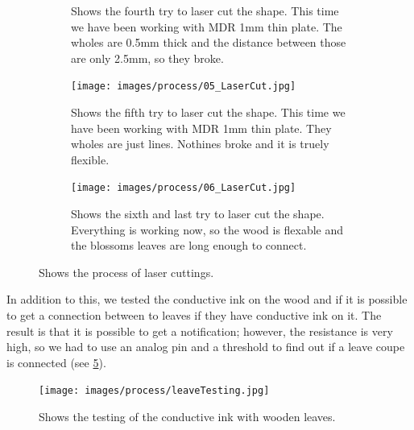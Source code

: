 \documentclass[00_doc.tex]{subfiles}
\begin{document}
\begin{figure}[H]
\begin{subfigure}{.45\textwidth}
            \caption{Shows the fourth try to laser cut the shape. This time we have been
                    working with MDR 1mm thin plate. The wholes are 0.5mm thick and the 
                    distance between those are only 2.5mm, so they broke.}
            \label{fig:04_LaserCut}
            \vspace{6mm}
        \end{subfigure}
        \hspace{1mm}
        \begin{subfigure}{.45\textwidth}
            \centering
            \texttt{[image: images/process/05\_LaserCut.jpg]}
            \caption{Shows the fifth try to laser cut the shape. This time we have been
                    working with MDR 1mm thin plate. They wholes are just lines. Nothines
                    broke and it is truely flexible.}
            \label{fig:04_LaserCut}
            \vspace{6mm}
        \end{subfigure}
        \hspace{1mm}
        \begin{subfigure}{.45\textwidth}
            \centering
            \texttt{[image: images/process/06\_LaserCut.jpg]}
            \caption{Shows the sixth and last try to laser cut the shape. Everything is 
            working now, so the wood is flexable and the blossoms leaves are long enough
            to connect. }
            \label{fig:04_LaserCut}
            \vspace{6mm}
        \end{subfigure}
        \caption{Shows the process of laser cuttings.}
        \label{fig:laserCutTests}
    \end{figure}

    \noindent
    In addition to this, we tested the conductive ink on the wood and if it is possible 
    to get a connection between to leaves if they have conductive ink on it. The result is
    that it is possible to get a notification; however, the resistance is very high, so we 
    had to use an analog pin and a threshold to find out if a leave coupe is connected
    (see \ref{fig:leaveConductiveInk}).

    \begin{figure}[h!]
        \centering
        \texttt{[image: images/process/leaveTesting.jpg]}
        \caption{Shows the testing of the conductive ink with wooden leaves.}
        \label{fig:leaveConductiveInk}
    \end{figure}
\end{document}
